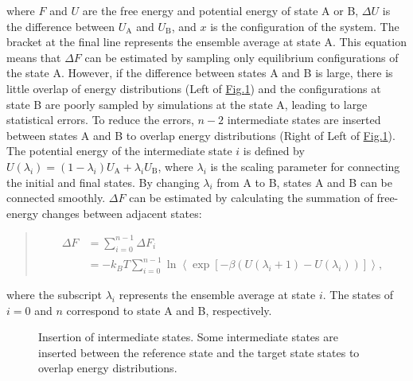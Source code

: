 \documentclass[a4paper,11pt,oneside,english]{sphinxmanual}
\begin{document}
where \(F\) and \(U\) are the free energy and potential energy of state A or B, \(\Delta U\) is the difference between \(U_{\text{A}}\) and \(U_{\text{B}}\), and \(x\) is the configuration of the system.
The bracket at the final line represents the ensemble average at state A.
This equation means that \(\Delta F\) can be estimated by sampling only equilibrium configurations of the state A.
However, if the difference between states A and B is large, there is little overlap of energy distributions (Left of \hyperref[\detokenize{20_Alchemy:intermediate-states}]{Fig.\@ \ref{\detokenize{20_Alchemy:intermediate-states}}}) and the configurations at state B are poorly sampled by simulations at the state A, leading to large statistical errors.
To reduce the errors, \(n-2\) intermediate states are inserted between states A and B to overlap energy distributions (Right of Left of \hyperref[\detokenize{20_Alchemy:intermediate-states}]{Fig.\@ \ref{\detokenize{20_Alchemy:intermediate-states}}}).
The potential energy of the intermediate state \(i\) is defined by \(U(\lambda_i) = (1-\lambda_i) U_{\text{A}} + \lambda_i U_{\text{B}}\), where \(\lambda_i\) is the scaling parameter for connecting the initial and final states.
By changing \(\lambda_i\) from A to B, states A and B can be connected smoothly.
\(\Delta F\) can be estimated by calculating the summation of free-energy changes between adjacent states:
\begin{quote}

\vspace{-5mm}
\begin{equation*}
\begin{split}\Delta F &= \sum_{i=0}^{n-1}\Delta F_i \\
    &= -k_BT \sum_{i=0}^{n-1} \ln \left< \exp [-\beta (U(\lambda_i+1)-U(\lambda_i))]\right>,\end{split}
\end{equation*}
\vspace{-3mm}
\end{quote}

where the subscript \(\lambda_i\) represents the ensemble average at state \(i\).
The states of \(i = 0\) and \(n\) correspond to state A and B, respectively.

\begin{figure}[htbp]
\centering
\capstart

\noindent{}
\caption{Insertion of intermediate states. Some intermediate states are inserted between the reference state and the target state states to overlap energy distributions.}\label{\detokenize{20_Alchemy:intermediate-states}}\end{figure}
\end{document}
